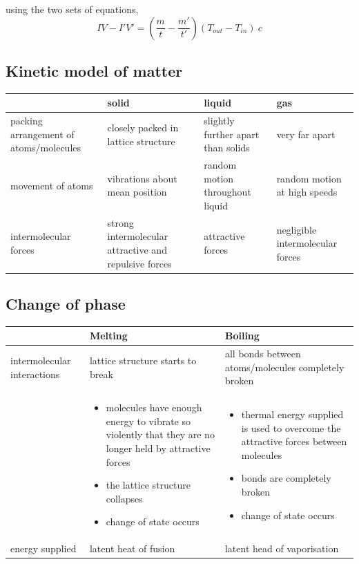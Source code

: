 \documentclass[a4paper, 10pt]{article}
\begin{document}
using the two sets of equations, 
\[
   IV - I'V' = \left( \frac{m}{t} - \frac{m'}{t'} \right) (T_{out} - T_{in})\  c
\]

\subsection{Kinetic model of matter} 
\begin{center}
   \begin{tabular}{L | L | L | L}
      & solid & liquid & gas \\
      \hline
      packing arrangement of atoms/molecules & closely packed in lattice structure 
                                             & slightly further apart than solids & 
                                             very far apart \\ 
                                             \hline
      movement of atoms & vibrations about mean position & random motion throughout liquid & random motion at high speeds \\ 
      \hline
      intermolecular forces & strong intermolecular attractive and repulsive forces & attractive forces & negligible intermolecular forces 
   \end{tabular}
\end{center}

\subsection{Change of phase}
\begin{center}
   \begin{tabular}{L | T | T}
      & Melting & Boiling \\
      \hline 
      intermolecular interactions & lattice structure starts to break & all bonds between atoms/molecules completely broken \\
      & 
      \begin{itemize}
         \item molecules have enough energy to vibrate so violently that they are no longer held by attractive forces
         \item the lattice structure collapses
         \item change of state occurs
      \end{itemize}	
      & 
      \begin{itemize}
         \item thermal energy supplied is used to overcome the attractive forces between molecules
         \item bonds are completely broken
         \item change of state occurs
      \end{itemize}	
      \\
      energy supplied & latent heat of fusion & latent head of vaporisation \\
      \hline
   \end{tabular}
\end{center}
\end{document}
